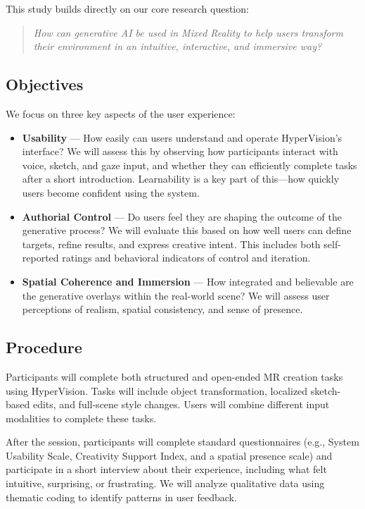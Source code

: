 This study builds directly on our core research question:

\begin{quote}
\textit{How can generative AI be used in Mixed Reality to help users transform their environment in an intuitive, interactive, and immersive way?}
\end{quote}

\subsection{Objectives}

We focus on three key aspects of the user experience:

\begin{itemize}
    \item \textbf{Usability} — How easily can users understand and operate HyperVision’s interface? We will assess this by observing how participants interact with voice, sketch, and gaze input, and whether they can efficiently complete tasks after a short introduction. Learnability is a key part of this—how quickly users become confident using the system.

    \item \textbf{Authorial Control} — Do users feel they are shaping the outcome of the generative process? We will evaluate this based on how well users can define targets, refine results, and express creative intent. This includes both self-reported ratings and behavioral indicators of control and iteration.

    \item \textbf{Spatial Coherence and Immersion} — How integrated and believable are the generative overlays within the real-world scene? We will assess user perceptions of realism, spatial consistency, and sense of presence.
\end{itemize}

\subsection{Procedure}

Participants will complete both structured and open-ended MR creation tasks using HyperVision. Tasks will include object transformation, localized sketch-based edits, and full-scene style changes. Users will combine different input modalities to complete these tasks.

After the session, participants will complete standard questionnaires (e.g., System Usability Scale, Creativity Support Index, and a spatial presence scale) and participate in a short interview about their experience, including what felt intuitive, surprising, or frustrating. We will analyze qualitative data using thematic coding to identify patterns in user feedback.

